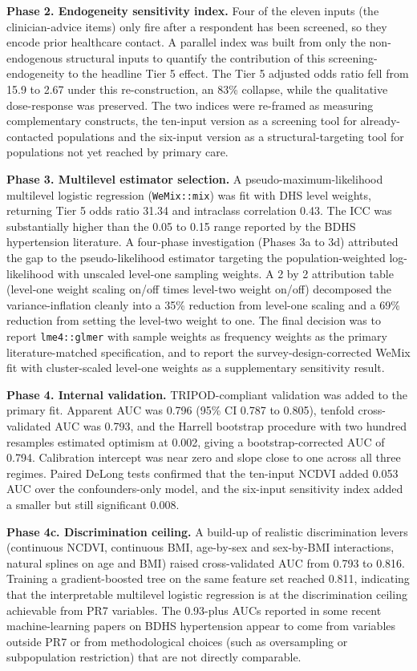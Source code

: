 \documentclass[
  12pt,
  a4paper]{article}
\begin{document}
\textbf{Phase 2. Endogeneity sensitivity index.} Four of the eleven inputs (the clinician-advice items) only fire after a respondent has been screened, so they encode prior healthcare contact. A parallel index was built from only the non-endogenous structural inputs to quantify the contribution of this screening-endogeneity to the headline Tier 5 effect. The Tier 5 adjusted odds ratio fell from 15.9 to 2.67 under this re-construction, an 83\% collapse, while the qualitative dose-response was preserved. The two indices were re-framed as measuring complementary constructs, the ten-input version as a screening tool for already-contacted populations and the six-input version as a structural-targeting tool for populations not yet reached by primary care.

\textbf{Phase 3. Multilevel estimator selection.} A pseudo-maximum-likelihood multilevel logistic regression (\texttt{WeMix::mix}) was fit with DHS level weights, returning Tier 5 odds ratio 31.34 and intraclass correlation 0.43. The ICC was substantially higher than the 0.05 to 0.15 range reported by the BDHS hypertension literature. A four-phase investigation (Phases 3a to 3d) attributed the gap to the pseudo-likelihood estimator targeting the population-weighted log-likelihood with unscaled level-one sampling weights. A 2 by 2 attribution table (level-one weight scaling on/off times level-two weight on/off) decomposed the variance-inflation cleanly into a 35\% reduction from level-one scaling and a 69\% reduction from setting the level-two weight to one. The final decision was to report \texttt{lme4::glmer} with sample weights as frequency weights as the primary literature-matched specification, and to report the survey-design-corrected WeMix fit with cluster-scaled level-one weights as a supplementary sensitivity result.

\textbf{Phase 4. Internal validation.} TRIPOD-compliant validation was added to the primary fit. Apparent AUC was 0.796 (95\% CI 0.787 to 0.805), tenfold cross-validated AUC was 0.793, and the Harrell bootstrap procedure with two hundred resamples estimated optimism at 0.002, giving a bootstrap-corrected AUC of 0.794. Calibration intercept was near zero and slope close to one across all three regimes. Paired DeLong tests confirmed that the ten-input NCDVI added 0.053 AUC over the confounders-only model, and the six-input sensitivity index added a smaller but still significant 0.008.

\textbf{Phase 4c. Discrimination ceiling.} A build-up of realistic discrimination levers (continuous NCDVI, continuous BMI, age-by-sex and sex-by-BMI interactions, natural splines on age and BMI) raised cross-validated AUC from 0.793 to 0.816. Training a gradient-boosted tree on the same feature set reached 0.811, indicating that the interpretable multilevel logistic regression is at the discrimination ceiling achievable from PR7 variables. The 0.93-plus AUCs reported in some recent machine-learning papers on BDHS hypertension appear to come from variables outside PR7 or from methodological choices (such as oversampling or subpopulation restriction) that are not directly comparable.
\end{document}
